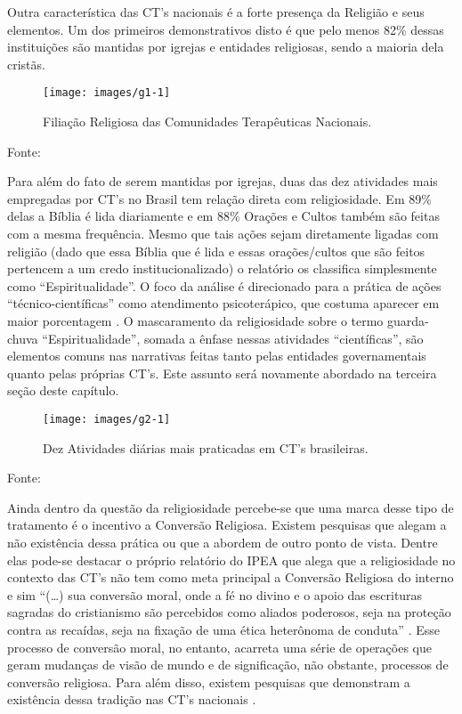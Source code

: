 \documentclass[
	12pt,				%
	oneside,			%
	a4paper,			%
	sumario=tradicional,
	english,			%
	brazil				%
	]{abntex2}
\newcommand{\bcenter}{\begin{center}}
\newcommand{\ecenter}{\end{center}}
\begin{document}
Outra característica das CT's nacionais é a forte presença da Religião e seus elementos. Um dos primeiros demonstrativos disto é que pelo menos 82\% dessas instituições são mantidas por igrejas e entidades religiosas, sendo a maioria dela cristãs.
\begin{figure}[H]

{\centering \texttt{[image: images/g1-1]} 

}

\caption{Filiação Religiosa das Comunidades Terapêuticas Nacionais.}\label{fig:g1}
\end{figure}
\bcenter

Fonte: \autocite{ipea_perfil_2017-1}
\ecenter

Para além do fato de serem mantidas por igrejas, duas das dez atividades mais empregadas por CT's no Brasil tem relação direta com religiosidade. Em 89\% delas a Bíblia é lida diariamente e em 88\% Orações e Cultos também são feitas com a mesma frequência. Mesmo que tais ações sejam diretamente ligadas com religião (dado que essa Bíblia que é lida e essas orações/cultos que são feitos pertencem a um credo institucionalizado) o relatório os classifica simplesmente como ``Espiritualidade''. O foco da análise é direcionado para a prática de ações ``técnico-científicas'' como atendimento psicoterápico, que costuma aparecer em maior porcentagem \autocite[22]{ipea_perfil_2017-1}. O mascaramento da religiosidade sobre o termo guarda-chuva ``Espiritualidade'', somada a ênfase nessas atividades ``científicas'', são elementos comuns nas narrativas feitas tanto pelas entidades governamentais quanto pelas próprias CT's. Este assunto será novamente abordado na terceira seção deste capítulo.
\begin{figure}[H]

{\centering \texttt{[image: images/g2-1]} 

}

\caption{Dez Atividades diárias mais praticadas em CT's brasileiras.}\label{fig:g2}
\end{figure}
\bcenter

Fonte: \autocite{ipea_perfil_2017-1}
\ecenter

Ainda dentro da questão da religiosidade percebe-se que uma marca desse tipo de tratamento é o incentivo a Conversão Religiosa. Existem pesquisas que alegam a não existência dessa prática \autocite{loeck_dependencia_2014} ou que a abordem de outro ponto de vista. Dentre elas pode-se destacar o próprio relatório do IPEA que alega que a religiosidade no contexto das CT's não tem como meta principal a Conversão Religiosa do interno e sim ``(\ldots) sua conversão moral, onde a fé no divino e o apoio das escrituras sagradas do cristianismo são percebidos como aliados poderosos, seja na proteção contra as recaídas, seja na fixação de uma ética heterônoma de conduta'' \autocite[35]{ipea_perfil_2017-1}. Esse processo de conversão moral, no entanto, acarreta uma série de operações que geram mudanças de visão de mundo e de significação, não obstante, processos de conversão religiosa. Para além disso, existem pesquisas que demonstram a existência dessa tradição nas CT's nacionais \autocite{targino_comunidades_2017-1,targino_experiencias_2020,mcbride_therapeutic_2018}.
\end{document}
